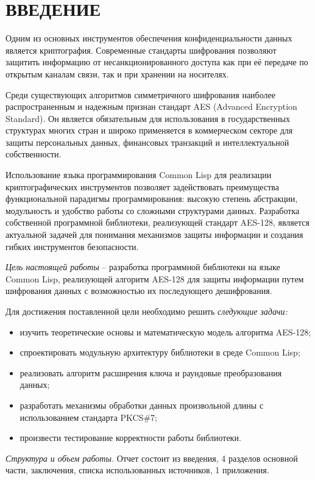 \section*{ВВЕДЕНИЕ}

 Одним из основных инструментов обеспечения конфиденциальности данных является криптография. Современные стандарты шифрования позволяют защитить информацию от несанкционированного доступа как при её передаче по открытым каналам связи, так и при хранении на носителях.

Среди существующих алгоритмов симметричного шифрования наиболее распространенным и надежным признан стандарт AES (Advanced Encryption Standard). Он является обязательным для использования в государственных структурах многих стран и широко применяется в коммерческом секторе для защиты персональных данных, финансовых транзакций и интеллектуальной собственности.

Использование языка программирования Common Lisp для реализации криптографических инструментов позволяет задействовать преимущества функциональной парадигмы программирования: высокую степень абстракции, модульность и удобство работы со сложными структурами данных. Разработка собственной программной библиотеки, реализующей стандарт AES-128, является актуальной задачей для понимания механизмов защиты информации и создания гибких инструментов безопасности.

\emph{Цель настоящей работы} – разработка программной библиотеки на языке Common Lisp, реализующей алгоритм AES-128 для защиты информации путем шифрования данных с возможностью их последующего дешифрования. 

Для достижения поставленной цели необходимо решить \emph{следующие задачи:}
\begin{itemize}
	\item изучить теоретические основы и математическую модель алгоритма AES-128;
	\item спроектировать модульную архитектуру библиотеки в среде Common Lisp;
	\item реализовать алгоритм расширения ключа и раундовые преобразования данных;
	\item разработать механизмы обработки данных произвольной длины с использованием стандарта PKCS\#7;
	\item произвести тестирование корректности работы библиотеки.
\end{itemize}

\emph{Структура и объем работы.} Отчет состоит из введения, 4 разделов основной части, заключения, списка использованных источников, 1 приложения. 

